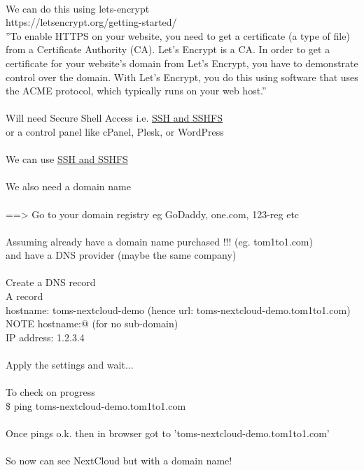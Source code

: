 \documentclass[10pt,a4paper]{article}
\begin{document}
{\\
We can do this using lets-encrypt\\
https://letsencrypt.org/getting-started/}{\large \\
''To enable HTTPS on your website, you need to get a certificate (a type of file) from a Certificate Authority (CA). Let’s Encrypt is a CA. In order to get a certificate for your website’s domain from Let’s Encrypt, you have to demonstrate control over the domain. With Let’s Encrypt, you do this using software that uses the ACME protocol, which typically runs on your web host.''\\
\\
	Will need Secure Shell Access i.e. \hyperlink{ssh___and_sshfs}{SSH   and SSHFS}}{\large  \\
	or a control panel like cPanel, Plesk, or WordPress\\
\\
	We can use \hyperlink{ssh___and_sshfs}{SSH   and SSHFS}}{\large \\
\\
	We also need a domain name\\
\\
==> Go to your domain registry eg GoDaddy, one.com, 123-reg etc\\
\\
Assuming already have a domain name purchased !!! (eg. tom1to1.com)\\
and have a DNS provider (maybe the same company)\\
\\
	Create a DNS record\\
	A record\\
	hostname: toms-nextcloud-demo    (hence url:   toms-nextcloud-demo.tom1to1.com)\\
		NOTE hostname:@   (for no sub-domain)\\
	IP address: 1.2.3.4\\
\\
	Apply the settings and wait...\\
\\
	To check on progress \\
	\$ ping toms-nextcloud-demo.tom1to1.com\\
	\\
	Once pings o.k. then in browser got to 'toms-nextcloud-demo.tom1to1.com'\\
\\
	So now can see NextCloud but with a domain name!\\
\\
}
\end{document}
